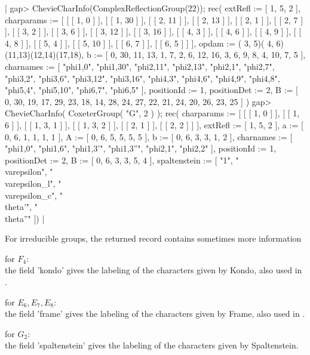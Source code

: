 |    gap> ChevieCharInfo(ComplexReflectionGroup(22));
    rec(
      extRefl := [ 1, 5, 2 ],
      charparams := 
       [ [ [ 1, 0 ] ], [ [ 1, 30 ] ], [ [ 2, 11 ] ], [ [ 2, 13 ] ], 
          [ [ 2, 1 ] ], [ [ 2, 7 ] ], [ [ 3, 2 ] ], [ [ 3, 6 ] ], 
          [ [ 3, 12 ] ], [ [ 3, 16 ] ], [ [ 4, 3 ] ], [ [ 4, 6 ] ], 
          [ [ 4, 9 ] ], [ [ 4, 8 ] ], [ [ 5, 4 ] ], [ [ 5, 10 ] ], 
          [ [ 6, 7 ] ], [ [ 6, 5 ] ] ],
      opdam := ( 3, 5)( 4, 6)(11,13)(12,14)(17,18),
      b := [ 0, 30, 11, 13, 1, 7, 2, 6, 12, 16, 3, 6, 9, 8, 4, 10, 7, 5 ],
      charnames := [ "phi{1,0}", "phi{1,30}", "phi{2,11}", "phi{2,13}", 
          "phi{2,1}", "phi{2,7}", "phi{3,2}", "phi{3,6}", "phi{3,12}", 
          "phi{3,16}", "phi{4,3}", "phi{4,6}", "phi{4,9}", "phi{4,8}", 
          "phi{5,4}", "phi{5,10}", "phi{6,7}", "phi{6,5}" ],
      positionId := 1,
      positionDet := 2,
      B := [ 0, 30, 19, 17, 29, 23, 18, 14, 28, 24, 27, 22, 21, 24, 20, 
          26, 23, 25 ] )
    gap>  ChevieCharInfo( CoxeterGroup( "G", 2 ) );
    rec(
      charparams := 
       [ [ [ 1, 0 ] ], [ [ 1, 6 ] ], [ [ 1, 3, 1 ] ], [ [ 1, 3, 2 ] ], 
          [ [ 2, 1 ] ], [ [ 2, 2 ] ] ],
      extRefl := [ 1, 5, 2 ],
      a := [ 0, 6, 1, 1, 1, 1 ],
      A := [ 0, 6, 5, 5, 5, 5 ],
      b := [ 0, 6, 3, 3, 1, 2 ],
      charnames := [ "phi{1,0}", "phi{1,6}", "phi{1,3}'", "phi{1,3}''",
          "phi{2,1}", "phi{2,2}" ],
      positionId := 1,
      positionDet := 2,
      B := [ 0, 6, 3, 3, 5, 4 ],
      spaltenstein := 
        [ "1", "\\varepsilon", "\\varepsilon_l", "\\varepsilon_c", 
           "\\theta'", "\\theta''" ]) |

For  irreducible  groups,  the  returned  record  contains  sometimes  more
information\:

for $F_4$:\\ the field 'kondo' gives the labeling of the characters given 
  by Kondo, also used in  \cite[(4.10)]{Lus85}.

for $E_6, E_7, E_8$:\\ the field 'frame' gives the labeling of the characters 
  given by Frame, also used in \cite[(4.11), (4.12), and  (4.13)]{Lus85}.

for $G_2$:\\ the field 'spaltenstein' gives the labeling of the characters 
  given by Spaltenstein.

